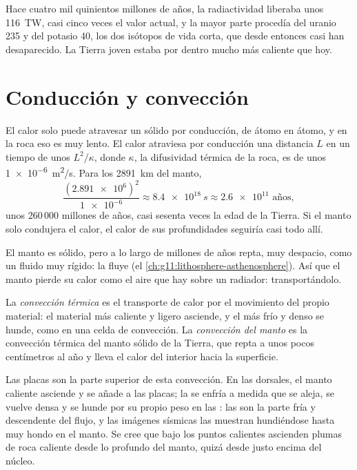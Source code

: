 Hace cuatro mil quinientos millones de años, la radiactividad liberaba unos
\qty{116}{TW}, casi cinco veces el valor actual, y la mayor parte procedía del
uranio 235 y del potasio 40, los dos isótopos de vida corta, que desde
entonces casi han desaparecido. La Tierra joven estaba por dentro mucho más
caliente que hoy.

\section{Conducción y convección}

El calor solo puede atravesar un sólido por conducción, de átomo en átomo, y
en la roca eso es muy lento. El calor atraviesa por conducción una distancia
$L$ en un tiempo de unos $L^2/\kappa$, donde $\kappa$, la difusividad térmica
de la roca, es de unos \qty{1e-6}{m^2/s}. Para los
\qty{2891}{km} del manto,
\[
  \frac{(\num{2.891e6})^2}{\num{1e-6}} \approx \qty{8.4e18}{s} \approx
  \num{2.6e11} \text{ años},
\]
unos 260\,000 millones de años, casi sesenta veces la edad de la Tierra. Si el
manto solo condujera el calor, el calor de sus profundidades seguiría casi
todo allí.

El manto es sólido, pero a lo largo de millones de años repta, muy despacio,
como un fluido muy rígido: la  fluye (el
\cref{ch:g11:lithosphere-asthenosphere}). Así que el manto pierde su calor como
el aire que hay sobre un radiador: transportándolo.

\begin{definition}\label{def:g12:internal-heat:convection}
La \emph{convección térmica} es el
transporte de calor por el movimiento del propio material: el material más
caliente y ligero asciende, y el más frío y denso se hunde, como en una celda
de convección. La \emph{convección del manto}
es la convección térmica del manto sólido de la Tierra, que repta a unos
pocos centímetros al año y lleva el calor del interior hacia la superficie.
\end{definition}

Las placas son la parte superior de esta convección. En las dorsales, el
manto caliente asciende y se añade a las placas; la  se enfría a
medida que se aleja, se vuelve densa y se hunde por su propio peso en las
: las  son la parte fría y descendente del flujo, y
las imágenes sísmicas las muestran hundiéndose hasta muy hondo en el manto. Se
cree que bajo los puntos calientes ascienden plumas de roca caliente desde lo
profundo del manto, quizá desde justo encima del núcleo.

